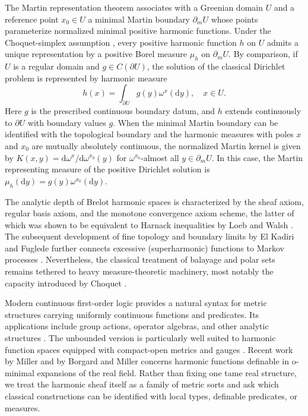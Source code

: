 \documentclass{amsart}
\theoremstyle{definition}
\theoremstyle{remark}
\numberwithin{equation}{section}
\begin{document}
	The Martin representation theorem \cite{Martin1941harmonic} associates with a Greenian domain $U$ and a reference point $x_0\in U$ a minimal Martin boundary $\partial_m U$ whose points parameterize normalized minimal positive harmonic functions. Under the Choquet-simplex assumption \cite{Choquet1954capacity}, every positive harmonic function $h$ on $U$ admits a unique representation by a positive Borel measure $\mu_h$ on $\partial_m U$. By comparison, if $U$ is a regular domain and $g\in C(\partial U)$, the solution of the classical Dirichlet problem is represented by harmonic measure
	\begin{equation}
		h(x)
		=
		\int_{\partial U}g(y)\omega^x(\mathrm{d}y),
		\quad x\in U.
		\label{eq:Dirichlet-problem}
	\end{equation}
	Here $g$ is the prescribed continuous boundary datum, and $h$
	extends continuously to $\partial U$ with boundary values $g$. When the minimal Martin boundary can be identified with the topological boundary and the harmonic measures with poles $x$ and $x_0$ are mutually absolutely continuous,
	the normalized Martin kernel is given by
	$K(x,y)=\mathrm{d}\omega^x/\mathrm{d}\omega^{x_0}(y)$
	for $\omega^{x_0}$-almost all $y\in\partial_m U$. In this case, the Martin
	representing measure of the positive Dirichlet solution is
	$\mu_h(\mathrm{d}y)=g(y)\omega^{x_0}(\mathrm{d}y)$.
	
	
	The analytic depth of Brelot harmonic spaces is characterized by the sheaf axiom, regular basis axiom, and the monotone convergence axiom scheme, the latter of which was shown to be equivalent to Harnack inequalities by Loeb and Walsh \cite{LW1965axiomatic}. The subsequent development of fine topology and boundary limits by El Kadiri and Fuglede \cite{ElKadiriFuglede2025} further connects excessive (superharmonic) functions to Markov processes \cite{Dynkin1962finetopo,doob1984classical}. Nevertheless, the classical treatment of balayage and polar sets remains tethered to heavy measure-theoretic machinery, most notably the capacity introduced by Choquet \cite{Choquet1954capacity}.
	
	Modern continuous first-order logic provides a natural syntax for
	metric structures carrying uniformly continuous functions and
	predicates. Its applications include group actions,
	operator algebras, and other analytic structures
	\cite{Berenstein2024freegroup,Dabrowski2019vonNeumann,GoldbringHoudayer2022wstar,Henson2017Gurarij}. The unbounded version
	is particularly well suited to harmonic function spaces equipped with
	compact-open metrics and gauges \cite{BenYaacov2008Unbounded}. Recent work by Miller
	\cite{Miller2026blms} and by Borgard and Miller \cite{Borgard_Miller_2026} concerns harmonic functions definable in o-minimal expansions of the real field. Rather than fixing one tame real structure, we treat the harmonic sheaf itself as a family of metric sorts and ask which classical constructions can be identified with local types, definable predicates, or measures.
	
\end{document}
